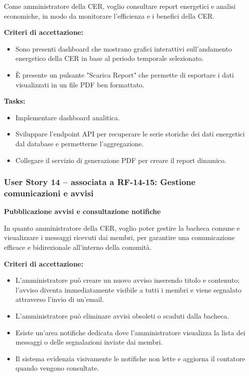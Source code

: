 Come amministratore della CER, voglio consultare report energetici e analisi economiche, in modo da monitorare l’efficienza e i benefici della CER.

\textbf{Criteri di accettazione:}
\begin{itemize}
    \item Sono presenti dashboard che mostrano grafici interattivi sull'andamento energetico della CER in base al periodo temporale selezionato.
    \item È presente un pulsante "Scarica Report" che permette di esportare i dati visualizzati in un file PDF ben formattato.
\end{itemize}
\textbf{Tasks:}
\begin{itemize}
    \item Implementare dashboard analitica.
    \item Sviluppare l'endpoint API per recuperare le serie storiche dei dati energetici dal database e permetterne l'aggregazione.
    \item Collegare il servizio di generazione PDF per creare il report dinamico.
\end{itemize}

\subsubsection*{User Story 14 – associata a RF-14-15: Gestione comunicazioni e avvisi}
\textbf{Pubblicazione avvisi e consultazione notifiche}

In quanto amministratore della CER, voglio poter gestire la bacheca comune e visualizzare i messaggi ricevuti dai membri, per garantire una comunicazione efficace e bidirezionale all'interno della comunità.

\textbf{Criteri di accettazione:}
\begin{itemize}
    \item L'amministratore può creare un nuovo avviso inserendo titolo e contenuto; l'avviso diventa immediatamente visibile a tutti i membri e viene segnalato attraverso l'invio di un'email.
    \item L'amministratore può eliminare avvisi obsoleti o scaduti dalla bacheca.
    \item Esiste un'area notifiche dedicata dove l'amministratore visualizza la lista dei messaggi o delle segnalazioni inviate dai membri.
    \item Il sistema evidenzia visivamente le notifiche non lette e aggiorna il contatore quando vengono consultate.
\end{itemize}


